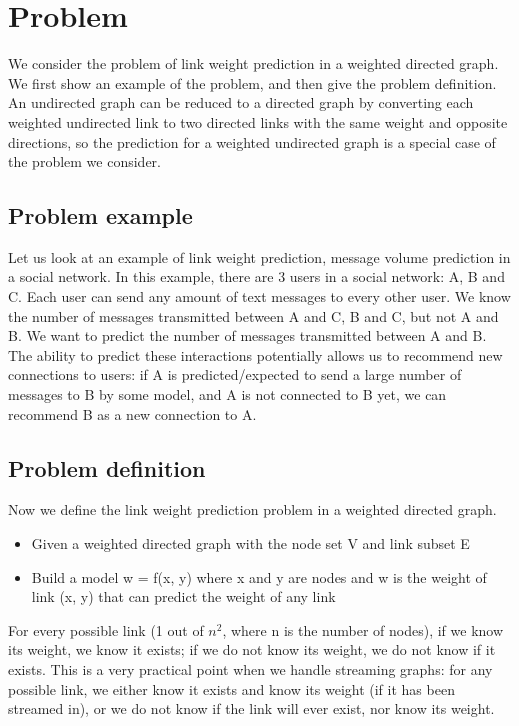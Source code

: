 \documentclass{article} %
\begin{document}
\section{Problem}
We consider the problem of link weight prediction in a weighted directed graph.
We first show an example of the problem,
and then give the problem definition.
An undirected graph can be reduced to a directed graph by converting each weighted undirected link to two directed links with the same weight and opposite directions,
so the prediction for a weighted undirected graph is a special case of the problem we consider.

\subsection{Problem example}
Let us look at an example of link weight prediction, message volume prediction in a social network.
In this example, there are 3 users in a social network: A, B and C.
Each user can send any amount of text messages to every other user.
We know the number of messages transmitted between A and C, B and C, but not A and B.
We want to predict the number of messages transmitted between A and B.
The ability to predict these interactions potentially allows us to recommend new connections to users:
if A is predicted/expected to send a large number of messages to B by some model,
and A is not connected to B yet,
we can recommend B as a new connection to A.

\subsection{Problem definition}
Now we define the link weight prediction problem in a weighted directed graph.
\begin{itemize}
	\item Given a weighted directed graph with the node set V and link subset E
	\item Build a model w = f(x, y) where x and y are nodes and w is the weight of link (x, y) that can predict the weight of any link
\end{itemize}
For every possible link (1 out of $ n^2 $, where n is the number of nodes), 
if we know its weight, we know it exists;
if we do not know its weight, we do not know if it exists.
This is a very practical point when we handle streaming graphs:
for any possible link,
we either know it exists and know its weight (if it has been streamed in), or we do not know if the link will ever exist, nor know its weight.
\end{document}
